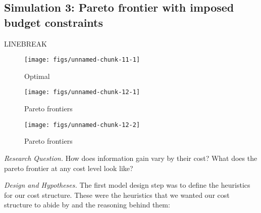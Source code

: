\documentclass[10pt, letterpaper]{apa6}
\newenvironment{CodeChunk}{}{}
\begin{document}
\subsection{Simulation 3: Pareto frontier with imposed budget
constraints}\label{simulation-3-pareto-frontier-with-imposed-budget-constraints}

LINEBREAK

\begin{CodeChunk}
\begin{figure}[t]
\texttt{[image: figs/unnamed-chunk-11-1]} \caption[Optimal]{Optimal}\label{fig:unnamed-chunk-11}
\end{figure}
\end{CodeChunk}

\begin{CodeChunk}
\begin{figure}[t]
\texttt{[image: figs/unnamed-chunk-12-1]} \caption[Pareto frontiers]{Pareto frontiers}\label{fig:unnamed-chunk-121}
\end{figure}
\begin{figure}[t]
\texttt{[image: figs/unnamed-chunk-12-2]} \caption[Pareto frontiers]{Pareto frontiers}\label{fig:unnamed-chunk-122}
\end{figure}
\end{CodeChunk}

\emph{Research Question. } How does information gain vary by their cost?
What does the pareto frontier at any cost level look like?

\emph{Design and Hypotheses. } The first model design step was to define
the heuristics for our cost structure. These were the heuristics that we
wanted our cost structure to abide by and the reasoning behind them:
\end{document}
